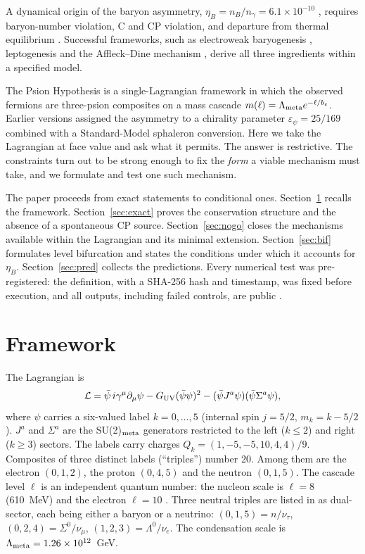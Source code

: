 \documentclass[11pt]{article}
\newcommand{\Lm}{\Lambda_{\rm meta}}
\begin{document}
A dynamical origin of the baryon asymmetry, $\eta_B=n_B/n_\gamma=6.1\times10^{-10}$ \cite{planck}, requires baryon-number violation, C and CP violation, and departure from thermal equilibrium \cite{sakharov}. Successful frameworks, such as electroweak baryogenesis \cite{krs}, leptogenesis \cite{fy,bdp} and the Affleck--Dine mechanism \cite{ad}, derive all three ingredients within a specified model.

The Psion Hypothesis \cite{phf} is a single-Lagrangian framework in which the observed fermions are three-psion composites on a mass cascade $m(\ell)=\Lm e^{-\ell/b_e}$. Earlier versions assigned the asymmetry to a chirality parameter $\varepsilon_\psi=25/169$ combined with a Standard-Model sphaleron conversion. Here we take the Lagrangian at face value and ask what it permits. The answer is restrictive. The constraints turn out to be strong enough to fix the \emph{form} a viable mechanism must take, and we formulate and test one such mechanism.

The paper proceeds from exact statements to conditional ones. Section~\ref{sec:fw} recalls the framework. Section~\ref{sec:exact} proves the conservation structure and the absence of a spontaneous CP source. Section~\ref{sec:nogo} closes the mechanisms available within the Lagrangian and its minimal extension. Section~\ref{sec:bif} formulates level bifurcation and states the conditions under which it accounts for $\eta_B$. Section~\ref{sec:pred} collects the predictions. Every numerical test was pre-registered: the definition, with a SHA-256 hash and timestamp, was fixed before execution, and all outputs, including failed controls, are public \cite{repo}.

\section{Framework}\label{sec:fw}

The Lagrangian is
\begin{equation}\label{eq:L}
\mathcal L=\bar\psi\, i\gamma^\mu\partial_\mu\psi-G_{\rm UV}(\bar\psi\psi)^2-(\bar\psi J^a\psi)(\bar\psi\Sigma^a\psi),
\end{equation}
where $\psi$ carries a six-valued label $k=0,\dots,5$ (internal spin $j=5/2$, $m_k=k-5/2$). $J^a$ and $\Sigma^a$ are the SU(2)$_{\rm meta}$ generators restricted to the left ($k\le2$) and right ($k\ge3$) sectors. The labels carry charges $Q_k=(1,-5,-5,10,4,4)/9$. Composites of three distinct labels (``triples'') number 20. Among them are the electron $(0,1,2)$, the proton $(0,4,5)$ and the neutron $(0,1,5)$. The cascade level $\ell$ is an independent quantum number: the nucleon scale is $\ell=8$ (610~MeV) and the electron $\ell=10$ \cite{phf}. Three neutral triples are listed in \cite{phf} as dual-sector, each being either a baryon or a neutrino: $(0,1,5)=n/\nu_\tau$, $(0,2,4)=\Sigma^0/\nu_\mu$, $(1,2,3)=\Lambda^0/\nu_e$. The condensation scale is $\Lm=1.26\times10^{12}$~GeV.
\end{document}
